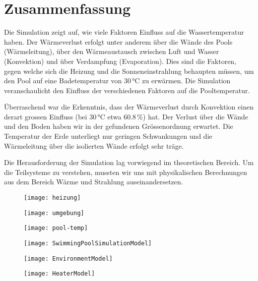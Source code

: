 \section{Zusammenfassung}
\label{sec:Zusammenfassung}
Die Simulation zeigt auf, wie viele Faktoren Einfluss auf die Wassertemperatur haben. Der Wärmeverlust erfolgt unter anderem über die Wände des Pools (Wärmeleitung), über den Wärmeaustausch zwischen Luft und Wasser (Konvektion) und über Verdampfung (Evaporation). Dies sind die Faktoren, gegen welche sich die Heizung und die Sonneneinstrahlung behaupten müssen, um den Pool auf eine Badetemperatur von 30\,°C zu erwärmen. Die Simulation veranschaulicht den Einfluss der verschiedenen Faktoren auf die Pooltemperatur.

Überraschend war die Erkenntnis, dass der Wärmeverlust durch Konvektion einen derart grossen Einfluss (bei 30\,°C etwa 60.8\,\%) hat. Der Verlust über die Wände und den Boden haben wir in der gefundenen Grössenordnung erwartet. Die Temperatur der Erde unterliegt nur geringen Schwankungen und die Wärmeleitung über die isolierten Wände erfolgt sehr träge.

Die Herausforderung der Simulation lag vorwiegend im theoretischen Bereich. Um die Teilsysteme zu verstehen, mussten wir uns mit physikalischen Berechnungen aus dem Bereich Wärme und Strahlung auseinandersetzen.


\begin{figure}[H]
	\centering
	\texttt{[image: heizung]}
	\caption{}
	\label{fig:heizung}
\end{figure}

\begin{figure}[H]
	\centering
	\texttt{[image: umgebung]}
	\caption{}
	\label{fig:umgebung}
\end{figure}

\begin{figure}[H]
	\centering
	\texttt{[image: pool-temp]}
	\caption{}
	\label{fig:pool-temp}
\end{figure}

\begin{figure}[H]
	\centering
	\texttt{[image: SwimmingPoolSimulationModel]}
	\caption{}
	\label{fig:SwimmingPoolSimulationModel}
\end{figure}
\begin{figure}[H]
	\centering
	\texttt{[image: EnvironmentModel]}
	\caption{}
	\label{fig:EnvironmentModel}
\end{figure}

\begin{figure}[H]
	\centering
	\texttt{[image: HeaterModel]}
	\caption{}
	\label{fig:HeaterModel}
\end{figure}


